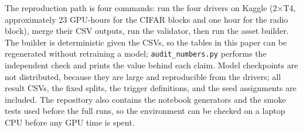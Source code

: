 The reproduction path is four commands: run the four drivers on Kaggle
(2$\times$T4, approximately 23 GPU-hours for the CIFAR blocks and one hour for the
radio block), merge their CSV outputs, run the validator, then run the asset
builder. The builder is deterministic given the CSVs, so the tables in this paper
can be regenerated without retraining a model; \texttt{audit\_numbers.py} performs
the independent check and prints the value behind each claim. Model checkpoints
are not distributed, because they are large and reproducible from the drivers;
all result CSVs, the fixed splits, the trigger definitions, and the seed
assignments are included. The repository also contains the notebook generators
and the smoke tests used before the full runs, so the environment can be checked
on a laptop CPU before any GPU time is spent.
